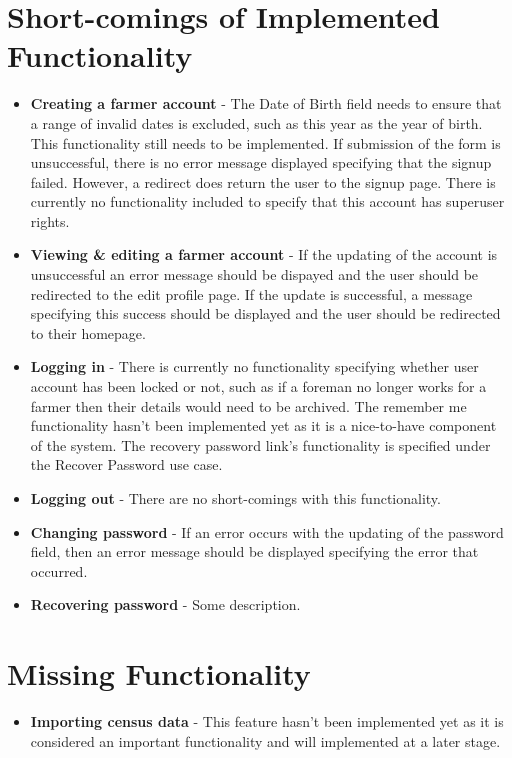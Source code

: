 \documentclass[11pt,fleqn]{book} %
\begin{document}
	\section{Short-comings of Implemented Functionality}
		\begin{itemize}
			\item\textbf{Creating a farmer account} -
			The Date of Birth field needs to ensure that a range of invalid dates is excluded, such as this year as the year of birth. This functionality still needs to be implemented. If submission of the form is unsuccessful, there is no error message displayed specifying that the signup failed. However, a redirect does return the user to the signup page. There is currently no functionality included to specify that this account has superuser rights.
			
			\item\textbf{Viewing \& editing a farmer account} - 
			If the updating of the account is unsuccessful an error message should be dispayed and the user should be redirected to the edit profile page. If the update is successful, a message specifying this success should be displayed and the user should be redirected to their homepage.
			
			\item\textbf{Logging in} -
			There is currently no functionality specifying whether user account has been locked or not, such as if a foreman no longer works for a farmer then their details would need to be archived. The remember me functionality hasn't been implemented yet as it is a nice-to-have component of the system. The recovery password link's functionality is specified under the Recover Password use case.
			
			\item\textbf{Logging out} -
			There are no short-comings with this functionality.
			
			\item\textbf{Changing password} -
			If an error occurs with the updating of the password field, then an error message should be displayed specifying the error that occurred.
			
			\item\textbf{Recovering password} -
			Some description.
		\end{itemize}
	\section{Missing Functionality}
		\begin{itemize}
			\item\textbf{Importing census data} -
			This feature hasn't been implemented yet as it is considered  an important functionality and will implemented at a later stage.
		\end{itemize}
\end{document}
